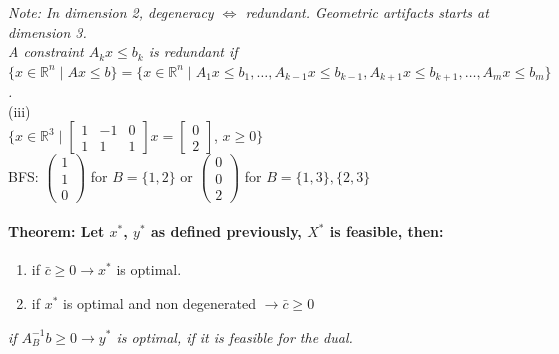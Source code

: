 \documentclass[main]{subfiles}
\begin{document}
\emph{Note: In dimension 2, degeneracy $\iff$ redundant. Geometric artifacts
starts at dimension 3.}\\

\emph{A constraint $A_k x \leq b_k$ is redundant if $\{ x\in \mathbb{R}^n \mid
Ax \leq b \} = \{x \in \mathbb{R}^n \mid A_1 x \leq b_1, \dots, A_{k-1} x \leq
b_{k-1}, A_{k+1} x \leq b_{k+1}, \dots, A_m x \leq b_m \}$.}\\

(iii)\\
$\{x \in \mathbb{R}^3 \mid 
\begin{bmatrix}
1 & -1 & 0\\
1 & 1 & 1
\end{bmatrix}
x =
\begin{bmatrix}
0\\
2
\end{bmatrix}$, $x \geq 0 \}$\\

BFS:
$\begin{pmatrix}
1\\
1\\
0
\end{pmatrix}$ for $B = \{1, 2\}$ or
$\begin{pmatrix}
0\\
0\\
2
\end{pmatrix}$ for $B = \{1,3\}, \{2, 3\}$

\paragraph{Theorem: Let $x^*$, $y^*$ as defined previously, $X^*$ is feasible,
then:}
\begin{enumerate}
\item if $\bar{c} \geq 0 \rightarrow x^*$ is optimal.
\item if $x^*$ is optimal and non degenerated $\rightarrow \bar{c} \geq 0$
\end{enumerate}

\emph{if $A^{-1}_B b \geq 0 \rightarrow y^*$ is optimal, if it is feasible for
the dual.}
\end{document}
